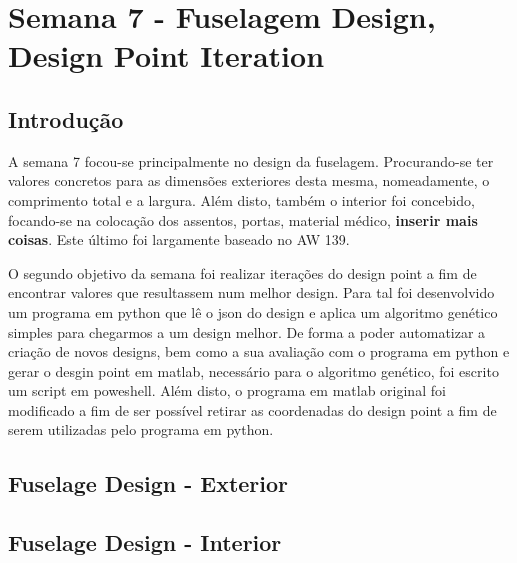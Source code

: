 \section{Semana 7 - Fuselagem Design, Design Point Iteration}

\subsection{Introdução}
A semana 7 focou-se principalmente no design da fuselagem. Procurando-se ter valores concretos para as dimensões exteriores desta mesma, nomeadamente, o comprimento total e a largura. Além disto, também o interior foi concebido, focando-se na colocação dos assentos, portas, material médico, \textbf{inserir mais coisas}. Este último foi largamente baseado no AW 139.\par
O segundo objetivo da semana foi realizar iterações do design point a fim de encontrar valores que resultassem num melhor design. Para tal foi desenvolvido um programa em python que lê o json do design e aplica um algoritmo genético simples para chegarmos a um design melhor. De forma a poder automatizar a criação de novos designs, bem como a sua avaliação com o programa em python e gerar o desgin point em matlab, necessário para o algoritmo genético, foi escrito um script em poweshell. Além disto, o programa em matlab original foi modificado a fim de ser possível retirar as coordenadas do design point a fim de serem utilizadas pelo programa em python. 
\subsection{Fuselage Design - Exterior}
\subsection{Fuselage Design - Interior}
